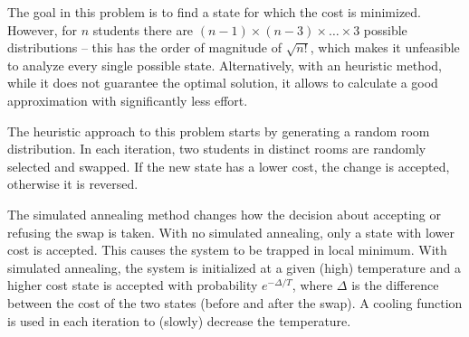 The goal in this problem is to find a state for which the cost is minimized. However, for $n$ students there are $(n-1)\times (n-3)\times\ldots\times 3$ possible distributions -- this has the order of magnitude of $\sqrt{n!}$, which makes it unfeasible to analyze every single possible state. Alternatively, with an heuristic method, while it does not guarantee the optimal solution, it allows to calculate a good approximation with significantly less effort.

The heuristic approach to this problem starts by generating a random room distribution. In each iteration, two students in distinct rooms are randomly selected and swapped. If the new state has a lower cost, the change is accepted, otherwise it is reversed.

The simulated annealing method changes how the decision about accepting or refusing the swap is taken. With no simulated annealing, only a state with lower cost is accepted. This causes the system to be trapped in local minimum. With simulated annealing, the system is initialized at a given (high) temperature and a higher cost state is accepted with probability $e^{-\Delta/T}$, where $\Delta$ is the difference between the cost of the two states (before and after the swap). A cooling function is used in each iteration to (slowly) decrease the temperature.